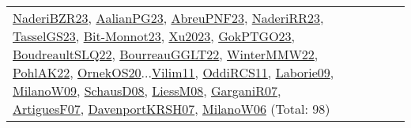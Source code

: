 {\begin{longtable}{p{3cm}r>{\raggedright\arraybackslash}p{6cm}>{\raggedright\arraybackslash}p{6cm}>{\raggedright\arraybackslash}p{8cm}}
\hyperref[detail:NaderiBZR23]{NaderiBZR23}, \hyperref[detail:AalianPG23]{AalianPG23}, \hyperref[detail:AbreuPNF23]{AbreuPNF23}, \hyperref[detail:NaderiRR23]{NaderiRR23}, \hyperref[detail:TasselGS23]{TasselGS23}, \hyperref[detail:Bit-Monnot23]{Bit-Monnot23}, \hyperref[detail:Xu2023]{Xu2023}, \hyperref[detail:GokPTGO23]{GokPTGO23}, \hyperref[detail:BoudreaultSLQ22]{BoudreaultSLQ22}, \hyperref[detail:BourreauGGLT22]{BourreauGGLT22}, \hyperref[detail:WinterMMW22]{WinterMMW22}, \hyperref[detail:PohlAK22]{PohlAK22}, \hyperref[detail:OrnekOS20]{OrnekOS20}...\hyperref[detail:Vilim11]{Vilim11}, \hyperref[detail:OddiRCS11]{OddiRCS11}, \hyperref[detail:Laborie09]{Laborie09}, \hyperref[detail:MilanoW09]{MilanoW09}, \hyperref[detail:SchausD08]{SchausD08}, \hyperref[detail:LiessM08]{LiessM08}, \hyperref[detail:GarganiR07]{GarganiR07}, \hyperref[detail:ArtiguesF07]{ArtiguesF07}, \hyperref[detail:DavenportKRSH07]{DavenportKRSH07}, \hyperref[detail:MilanoW06]{MilanoW06} (Total: 98)\\

\end{longtable}}
